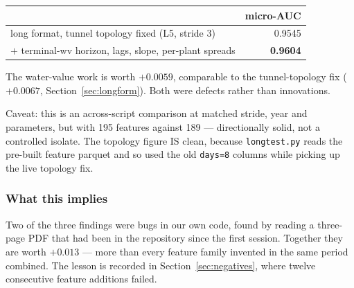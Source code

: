 \begin{center}\small
\begin{tabular}{lr}
\toprule
& micro-AUC \\
\midrule
long format, tunnel topology fixed (L5, stride 3) & 0.9545 \\
$+$ terminal-wv horizon, lags, slope, per-plant spreads & \textbf{0.9604} \\
\bottomrule
\end{tabular}
\end{center}

\begin{finding}
The water-value work is worth \textbf{$+0.0059$}, comparable to the tunnel-topology fix
($+0.0067$, Section~\ref{sec:longform}). Both were defects rather than innovations.
\end{finding}

Caveat: this is an across-script comparison at matched stride, year and parameters, but with 195
features against 189 --- directionally solid, not a controlled isolate. The topology figure IS
clean, because \texttt{longtest.py} reads the pre-built feature parquet and so used the old
\texttt{days=8} columns while picking up the live topology fix.

\subsubsection*{What this implies}

Two of the three findings were bugs in our own code, found by reading a three-page PDF that had
been in the repository since the first session. Together they are worth $+0.013$ --- more than
every feature family invented in the same period combined. The lesson is recorded in
Section~\ref{sec:negatives}, where twelve consecutive feature additions failed.
